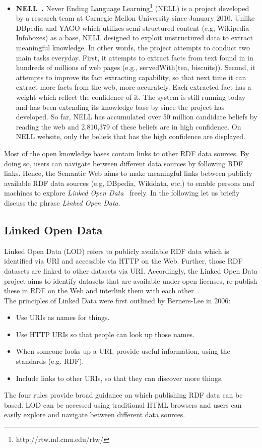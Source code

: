 \begin{itemize}
\item \textbf{NELL~\cite{DBLP:conf/wsdm/CarlsonBWHM10}.} Never Ending Language Learning\footnote{http://rtw.ml.cmu.edu/rtw/} (NELL) is a project developed by a research team at Carnegie Mellon University since January 2010. Unlike DBpedia and YAGO which utilizes semi-structured content (e.g, Wikipedia Infoboxes)  as a base, NELL designed to exploit unstructured data to extract meaningful knowledge. In other words, the project attempts to conduct two main tasks everyday.
First, it attempts to extract facts from text found in in hundreds of millions of web pages (e.g., servedWith(tea, biscuits)).
Second, it attempts to improve its fact extracting capability, so that next time it can extract more facts from the web, more accurately. Each extracted fact has a weight which reflect the confidence of it. The system is still running today and has been extending its knowledge base by since the project has developed. So far, NELL has accumulated over 50 million candidate beliefs by reading the web and 2,810,379 of these beliefs are in high confidence. On NELL website, only the beliefs that has the high confidence are displayed. 
\end{itemize}\vspace{0.5cm}
\noindent Most of the open knowledge bases contain links to other RDF data sources. By doing so, users can navigate between
different data sources by following RDF links. Hence, the Semantic Web aims to make meaningful links between publicly available RDF data sources (e.g, DBpedia, Wikidata, etc.) to enable persons and machines to explore \textit{Linked Open Data}~\cite{} freely. In the following let us  briefly discuss the phrase \textit{Linked Open Data}.\\

\subsection{Linked Open Data}
Linked Open Data (LOD) refers to publicly available RDF data which is identified via URI and accessible via HTTP on the Web. Further, those RDF datasets are linked to other datasets via URI. Accordingly, the Linked Open Data project aims to identify datasets that are available under open licenses, re-publish
these in RDF on the Web and interlink them with each other~\cite{DBLP:conf/www/BizerHIB08}. \\
The principles of Linked Data were first outlined by Berners-Lee in 2006:
\begin{itemize}
\item Use URIs as names for things.
\item Use HTTP URIs so that people can look up those names.
\item When someone looks up a URI, provide useful information, using the standards (e.g. RDF).
\item Include links to other URIs, so that they can discover more
things.
\end{itemize}
The four rules provide broad guidance on which publishing RDF data can be based. LOD can be accessed using traditional HTML
browsers and users can easily explore and navigate between different data sources.

